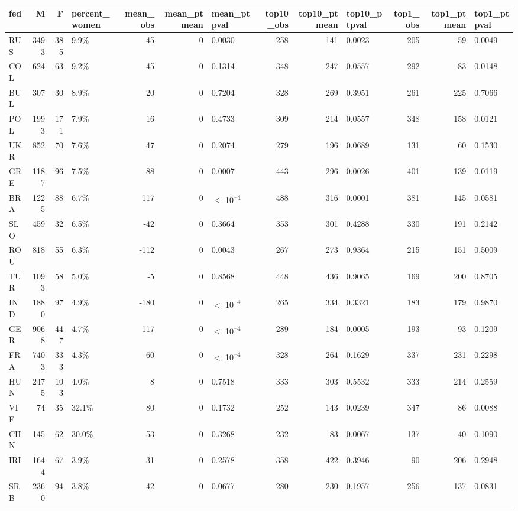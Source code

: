 
\begin{tabular}[t]{lrrlrrlrrlrrl}
\toprule
fed & M & F & percent_women & mean_obs & mean_ptmean & mean_ptpval & top10_obs & top10_ptmean & top10_ptpval & top1_obs & top1_ptmean & top1_ptpval\\
\midrule
RUS & 3493 & 385 & 9.9\% & 45 & 0 & 0.0030 & 258 & 141 & 0.0023 & 205 & 59 & 0.0049\\
COL & 624 & 63 & 9.2\% & 45 & 0 & 0.1314 & 348 & 247 & 0.0557 & 292 & 83 & 0.0148\\
BUL & 307 & 30 & 8.9\% & 20 & 0 & 0.7204 & 328 & 269 & 0.3951 & 261 & 225 & 0.7066\\
POL & 1993 & 171 & 7.9\% & 16 & 0 & 0.4733 & 309 & 214 & 0.0557 & 348 & 158 & 0.0121\\
UKR & 852 & 70 & 7.6\% & 47 & 0 & 0.2074 & 279 & 196 & 0.0689 & 131 & 60 & 0.1530\\
GRE & 1187 & 96 & 7.5\% & 88 & 0 & 0.0007 & 443 & 296 & 0.0026 & 401 & 139 & 0.0119\\
BRA & 1225 & 88 & 6.7\% & 117 & 0 & $<$ 10\textsuperscript{--4} & 488 & 316 & 0.0001 & 381 & 145 & 0.0581\\
SLO & 459 & 32 & 6.5\% & -42 & 0 & 0.3664 & 353 & 301 & 0.4288 & 330 & 191 & 0.2142\\
ROU & 818 & 55 & 6.3\% & -112 & 0 & 0.0043 & 267 & 273 & 0.9364 & 215 & 151 & 0.5009\\
TUR & 1093 & 58 & 5.0\% & -5 & 0 & 0.8568 & 448 & 436 & 0.9065 & 169 & 200 & 0.8705\\
IND & 1880 & 97 & 4.9\% & -180 & 0 & $<$ 10\textsuperscript{--4} & 265 & 334 & 0.3321 & 183 & 179 & 0.9870\\
GER & 9068 & 447 & 4.7\% & 117 & 0 & $<$ 10\textsuperscript{--4} & 289 & 184 & 0.0005 & 193 & 93 & 0.1209\\
FRA & 7403 & 333 & 4.3\% & 60 & 0 & $<$ 10\textsuperscript{--4} & 328 & 264 & 0.1629 & 337 & 231 & 0.2298\\
HUN & 2475 & 103 & 4.0\% & 8 & 0 & 0.7518 & 333 & 303 & 0.5532 & 333 & 214 & 0.2559\\
VIE & 74 & 35 & 32.1\% & 80 & 0 & 0.1732 & 252 & 143 & 0.0239 & 347 & 86 & 0.0088\\
CHN & 145 & 62 & 30.0\% & 53 & 0 & 0.3268 & 232 & 83 & 0.0067 & 137 & 40 & 0.1090\\
IRI & 1644 & 67 & 3.9\% & 31 & 0 & 0.2578 & 358 & 422 & 0.3946 & 90 & 206 & 0.2948\\
SRB & 2360 & 94 & 3.8\% & 42 & 0 & 0.0677 & 280 & 230 & 0.1957 & 256 & 137 & 0.0831\\

\end{tabular}
